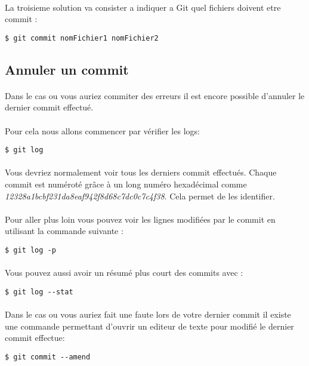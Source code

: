 \documentclass[french, a4paper, 12pt, titlepage]{article}
\begin{document}
\paragraph{}La troisieme solution va consister a indiquer a Git quel fichiers doivent etre commit :
\begin{lstlisting}
$ git commit nomFichier1 nomFichier2
\end{lstlisting}

\subsection{Annuler un commit}
\paragraph{}Dans le cas ou vous auriez commiter des erreurs il est encore possible d'annuler le dernier commit effectué.
\paragraph{}Pour cela nous allons commencer par vérifier les logs:
\begin{lstlisting}
$ git log
\end{lstlisting}

\paragraph{}Vous devriez normalement voir tous les derniers commit effectués. Chaque commit est numéroté grâce à un long numéro hexadécimal comme \textit{12328a1bcbf231da8eaf942f8d68c7dc0c7c4f38}. 
Cela permet de les identifier.

\paragraph{}Pour aller plus loin vous pouvez voir les lignes modifiées par le commit en utilisant la commande suivante :
\begin{lstlisting}
$ git log -p
\end{lstlisting}
\paragraph{}Vous pouvez aussi avoir un résumé plus court des commits avec :
\begin{lstlisting}
$ git log --stat
\end{lstlisting}

\paragraph{}Dans le cas ou vous auriez fait une faute lors de votre dernier commit il existe une commande permettant d'ouvrir un editeur de texte pour modifié le dernier commit effectue:
\begin{lstlisting}
$ git commit --amend
\end{lstlisting}
\end{document}
